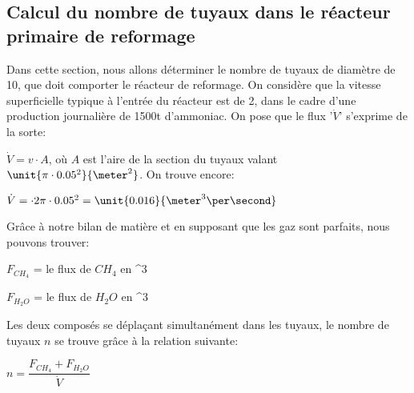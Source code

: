 


\subsection{Calcul du nombre de tuyaux dans le réacteur primaire de reformage}

Dans cette section, nous allons déterminer le nombre de tuyaux de diamètre de \unit{10}{\centi\meter}, que doit comporter le réacteur de reformage. On considère que la vitesse superficielle typique à l'entrée du réacteur est de \unit{2}{\meter\per\second}, dans le cadre d'une production journalière de \unit{1500}{t} d'ammoniac. On pose que le flux '$\dot{V}$' s'exprime de la sorte:

$\dot{V} = v \cdot A$, où $A$ est l'aire de la section du tuyaux valant $\unit{\pi \cdot 0.05^2}{\meter ^2}$. On trouve encore:

$\dot{V} = \cdot 2 \pi \cdot 0.05^2 = \unit{0.016}{\meter ^3 \per\second}$

Grâce à notre bilan de matière et en supposant que les gaz sont parfaits, nous pouvons trouver:

$F_{CH_4}$ = le flux de $CH_4$ en \unit{}{\meter ^3 \per\second}

$F_{H_2O}$ = le flux de $H_2O$ en \unit{}{\meter ^3 \per\second}

Les deux composés se déplaçant simultanément dans les tuyaux, le nombre de tuyaux $n$ se trouve grâce à la relation suivante:

$n = \dfrac{F_{CH_4} + F_{H_2O}}{\dot{V}}$

